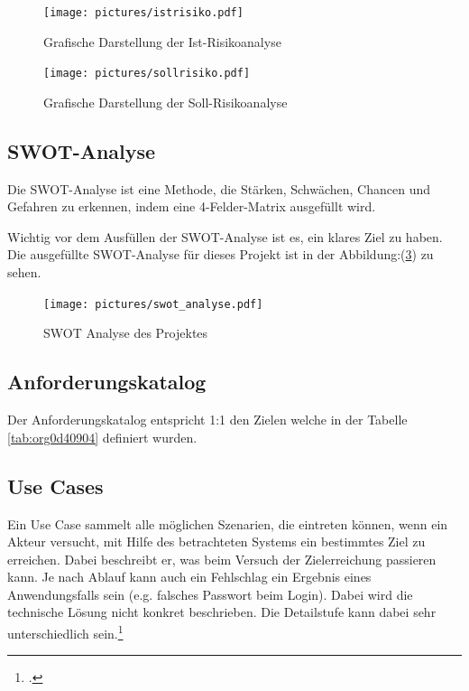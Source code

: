 \begin{figure}[H]
\centering
\texttt{[image: pictures/istrisiko.pdf]}
\caption{\label{fig:orgcef13e5}
Grafische Darstellung der Ist-Risikoanalyse}
\end{figure}

\begin{figure}[H]
\centering
\texttt{[image: pictures/sollrisiko.pdf]}
\caption{\label{fig:org9702b8a}
Grafische Darstellung der Soll-Risikoanalyse}
\end{figure}

\newpage
\subsection{SWOT-Analyse}
\label{sec:orgfb71849}

Die SWOT-Analyse ist eine Methode, die Stärken, Schwächen, Chancen und
Gefahren zu erkennen, indem eine 4-Felder-Matrix ausgefüllt wird.

Wichtig vor dem Ausfüllen der SWOT-Analyse ist es, ein klares Ziel zu
haben. Die ausgefüllte SWOT-Analyse für dieses Projekt ist in der
Abbildung:(\ref{fig:org6eab323}) zu sehen.

\begin{figure}[htbp]
\centering
\texttt{[image: pictures/swot\_analyse.pdf]}
\caption{\label{fig:org6eab323}
SWOT Analyse des Projektes}
\end{figure}

\subsection{Anforderungskatalog}
\label{sec:org1e5b49a}

Der Anforderungskatalog entspricht 1:1 den Zielen welche in der Tabelle
\ref{tab:org0d40904} definiert wurden.

\subsection{Use Cases}
\label{sec:org4ecc491}

Ein Use Case sammelt alle möglichen Szenarien, die eintreten können,
wenn ein Akteur versucht, mit Hilfe des betrachteten Systems ein
bestimmtes Ziel zu erreichen. Dabei beschreibt er, was beim Versuch der
Zielerreichung passieren kann. Je nach Ablauf kann auch ein Fehlschlag
ein Ergebnis eines Anwendungsfalls sein (e.g. falsches Passwort beim
Login). Dabei wird die technische Lösung nicht konkret beschrieben.
Die Detailstufe kann dabei sehr unterschiedlich sein.\footcite{usecase}

